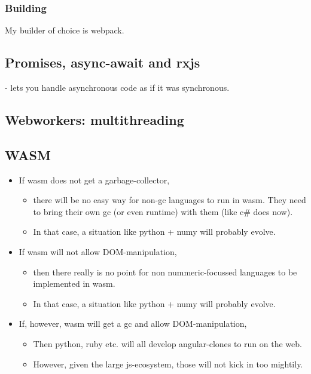 \subsubsection{Building}
My builder of choice is webpack. 



\subsection{Promises, async-await and rxjs}
 -  lets you handle asynchronous code as if it was synchronous. 

\subsection{Webworkers: multithreading}


\subsection{WASM}
\begin{itemize}
    \item If wasm does not get a garbage-collector, 
        \begin{itemize}
            \item there will be no easy way for non-gc languages to run in wasm. They need to bring their own gc (or even runtime) with them (like c\# does now). 
            \item In that case, a situation like python + numy will probably evolve.
        \end{itemize}
    \item If wasm will not allow DOM-manipulation, 
        \begin{itemize}
            \item then there really is no point for non nummeric-focussed languages to be implemented in wasm.
            \item In that case, a situation like python + numy will probably evolve.
        \end{itemize}
    \item If, however, wasm will get a gc and allow DOM-manipulation, 
        \begin{itemize}
            \item Then python, ruby etc. will all develop angular-clones to run on the web. 
            \item However, given the large js-ecosystem, those will not kick in too mightily. 
        \end{itemize}
\end{itemize}


